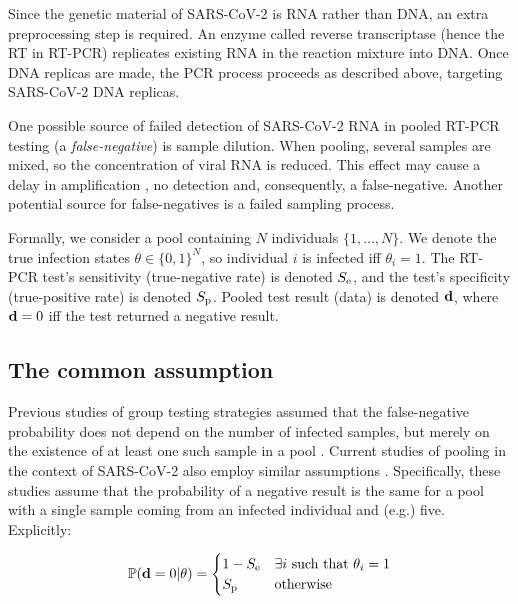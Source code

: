 \documentclass{article}
\begin{document}
Since the genetic material of SARS-CoV-2 is RNA rather than DNA, an
extra preprocessing step is required. An enzyme called reverse
transcriptase (hence the RT in RT-PCR) replicates existing RNA in the
reaction mixture into DNA. Once DNA replicas are made, the PCR process
proceeds as described above, targeting SARS-CoV-2 DNA replicas.

One possible source of failed detection of SARS-CoV-2 RNA in pooled
RT-PCR testing (a \emph{false-negative}) is sample dilution. When
pooling, several samples are mixed, so the concentration of viral RNA
is reduced. This effect may cause a delay in amplification
\cite{DorfmanYuvalDor}, no detection and, consequently, a
false-negative. Another potential source for false-negatives is a
failed sampling process. 


Formally, we consider a pool containing $N$ individuals
$\{1,\dots,N\}$. We denote the true infection states $\theta \in
\{0,1\}^N$, so individual $i$ is infected iff $\theta_i=1$. The RT-PCR
test's sensitivity (true-negative rate) is denoted $S_{\text{e}}$, and the
test's specificity (true-positive rate) is denoted $S_{\text{p}}$. Pooled
test result (data) is denoted $\mathbf{d}$, where $\mathbf{d}=0$ iff the test
returned a negative result.

\subsection{The common assumption}\label{subsec:common}
Previous studies of group testing strategies assumed that the
false-negative probability does not depend on the number of infected
samples, but merely on the existence of at least one such sample in a
pool \cite{Kim, OptimalDorfmanPool}. Current studies of pooling in the
context of SARS-CoV-2 also employ similar assumptions
\cite{Simplistic1, Simplistic2}. Specifically, these studies assume
that the probability of a negative result is the same for a pool with
a single sample coming from an infected individual and (e.g.)
five. Explicitly:

\begin{align}\label{eq:common}
  \mathbb{P}(\mathbf{d}=0|\theta) = 
  \begin{cases} 
    1-S_{\text{e}} & \exists i\ \text{such that } \theta_i = 1\\
    S_{\text{p}} & \text{otherwise}
  \end{cases} 
\end{align}
\end{document}
